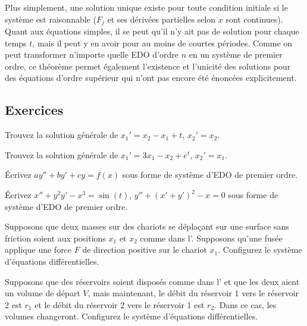 Plus simplement, une solution unique existe pour toute condition initiale si le système est raisonnable ($F_j$ et ses dérivées partielles selon $x$ sont continues). Quant aux équations simples, il se peut qu’il n’y ait pas de solution pour chaque temps $t$, mais il peut y en avoir pour au moins de courtes périodes.
Comme on peut transformer n’importe quelle EDO d’ordre $n$ en un système de premier ordre, ce théorème permet également l'existence et l'unicité des solutions pour des équations d’ordre supérieur qui n’ont pas encore été énoncées explicitement.

\subsection{Exercices}

\begin{exercise}
Trouvez la solution générale de $x_1' = x_2 - x_1 + t$, $x_2' = x_2$.
\end{exercise}

\begin{exercise}
Trouvez la solution générale de $x_1' = 3 x_1 - x_2 + e^t$, $x_2' = x_1$.
\end{exercise}

\begin{exercise}
Écrivez $ay'' + by' + cy = f(x)$
sous forme de système d’EDO de premier ordre.
\end{exercise}

\begin{exercise}
Écrivez $x'' + y^2 y' - x^3 = \sin(t)$, 
$y'' + {(x'+y')}^2 -x = 0$ sous forme de système d’EDO de premier ordre.
\end{exercise}

\begin{exercise}
Supposons que deux masses sur des chariots se déplaçant sur une surface sans friction soient aux positions $x_1$ et $x_2$ comme dans l'.
Supposons qu'une fusée applique une force $F$ de direction positive sur le chariot
$x_1$. Configurez le système d’équations différentielles.
\end{exercise}

\begin{exercise}
Supposons que des réservoirs soient disposés comme dans l’ et que les deux aient un volume de départ  $V$,
mais maintenant, le débit du réservoir 1 vers le réservoir 2 est $r_1$ et le débit du réservoir 2 vers le réservoir 1 est $r_2$.  Dans ce cas, les volumes changeront. Configurez le système d’équations différentielles.
\end{exercise}

